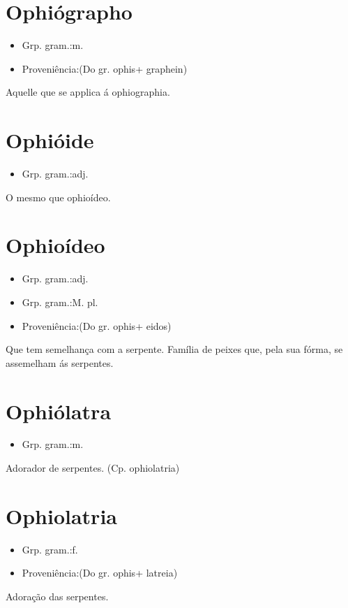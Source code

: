 \section{Ophiógrapho}
\begin{itemize}
\item {Grp. gram.:m.}
\end{itemize}
\begin{itemize}
\item {Proveniência:(Do gr. \textunderscore ophis\textunderscore  + \textunderscore graphein\textunderscore )}
\end{itemize}
Aquelle que se applica á ophiographia.
\section{Ophióide}
\begin{itemize}
\item {Grp. gram.:adj.}
\end{itemize}
O mesmo que \textunderscore ophioídeo\textunderscore .
\section{Ophioídeo}
\begin{itemize}
\item {Grp. gram.:adj.}
\end{itemize}
\begin{itemize}
\item {Grp. gram.:M. pl.}
\end{itemize}
\begin{itemize}
\item {Proveniência:(Do gr. \textunderscore ophis\textunderscore  + \textunderscore eidos\textunderscore )}
\end{itemize}
Que tem semelhança com a serpente.
Família de peixes que, pela sua fórma, se assemelham ás serpentes.
\section{Ophiólatra}
\begin{itemize}
\item {Grp. gram.:m.}
\end{itemize}
Adorador de serpentes.
(Cp. \textunderscore ophiolatria\textunderscore )
\section{Ophiolatria}
\begin{itemize}
\item {Grp. gram.:f.}
\end{itemize}
\begin{itemize}
\item {Proveniência:(Do gr. \textunderscore ophis\textunderscore  + \textunderscore latreia\textunderscore )}
\end{itemize}
Adoração das serpentes.
